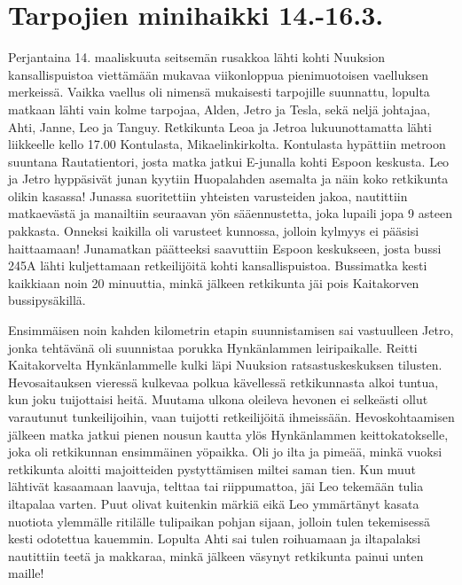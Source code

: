 \section{Tarpojien minihaikki 14.-16.3.}

\begin{multicols}{2}

\noindent Perjantaina 14. maaliskuuta seitsemän rusakkoa lähti kohti Nuuksion kansallispuistoa viettämään mukavaa viikonloppua pienimuotoisen vaelluksen merkeissä. Vaikka vaellus oli nimensä mukaisesti tarpojille suunnattu, lopulta matkaan lähti vain kolme tarpojaa, Alden, Jetro ja Tesla, sekä neljä johtajaa, Ahti, Janne, Leo ja Tanguy. Retkikunta Leoa ja Jetroa lukuunottamatta lähti liikkeelle kello 17.00 Kontulasta, Mikaelinkirkolta. Kontulasta hypättiin metroon suuntana Rautatientori, josta matka jatkui E-junalla kohti Espoon keskusta. Leo ja Jetro hyppäsivät junan kyytiin Huopalahden asemalta ja näin koko retkikunta olikin kasassa! Junassa suoritettiin yhteisten varusteiden jakoa, nautittiin matkaevästä ja manailtiin seuraavan yön sääennustetta, joka lupaili jopa 9 asteen pakkasta. Onneksi kaikilla oli varusteet kunnossa, jolloin kylmyys ei pääsisi haittaamaan! Junamatkan päätteeksi saavuttiin Espoon keskukseen, josta bussi 245A lähti kuljettamaan retkeilijöitä kohti kansallispuistoa. Bussimatka kesti kaikkiaan noin 20 minuuttia, minkä jälkeen retkikunta jäi pois Kaitakorven bussipysäkillä. 

Ensimmäisen noin kahden kilometrin etapin suunnistamisen sai vastuulleen Jetro, jonka tehtävänä oli suunnistaa porukka Hynkänlammen leiripaikalle. Reitti Kaitakorvelta Hynkänlammelle kulki läpi Nuuksion ratsastuskeskuksen tilusten. Hevosaitauksen vieressä kulkevaa polkua kävellessä retkikunnasta alkoi tuntua, kun joku tuijottaisi heitä. Muutama ulkona oleileva hevonen ei selkeästi ollut varautunut tunkeilijoihin, vaan tuijotti retkeilijöitä ihmeissään. Hevoskohtaamisen jälkeen matka jatkui pienen nousun kautta ylös Hynkänlammen keittokatokselle, joka oli retkikunnan ensimmäinen yöpaikka. Oli jo ilta ja pimeää, minkä vuoksi retkikunta aloitti majoitteiden pystyttämisen miltei saman tien. Kun muut lähtivät kasaamaan laavuja, telttaa tai riippumattoa, jäi Leo tekemään tulia iltapalaa varten. Puut olivat kuitenkin märkiä eikä Leo ymmärtänyt kasata nuotiota ylemmälle ritilälle tulipaikan pohjan sijaan, jolloin tulen tekemisessä kesti odotettua kauemmin. Lopulta Ahti sai tulen roihuamaan ja iltapalaksi nautittiin teetä ja makkaraa, minkä jälkeen väsynyt retkikunta painui unten maille!


\end{multicols}
